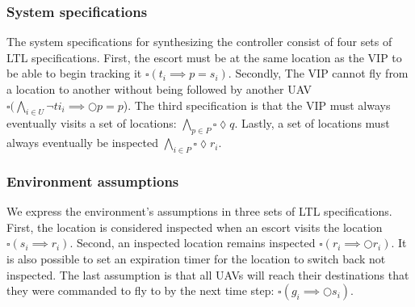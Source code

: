 \documentclass[]{article}
\begin{document}
\subsubsection{System specifications}\label{system-specifications}
The system specifications for synthesizing the controller consist of four 
sets of LTL specifications. First, the escort must be at the same location as the 
VIP to be able to begin tracking it $\square (t_{i} \implies p = s_{i})$. Secondly, The VIP 
cannot fly from a location to another without being followed by another UAV 
$\square(\bigwedge\limits_{i\in U}\lnot ti_{i} \implies \Circle p = p$). The third specification is that the VIP must always 
eventually visits a set of locations: $\bigwedge\limits_{p\in P}\square \lozenge q$. Lastly, a set of locations must 
always eventually be inspected $\bigwedge\limits_{i\in P}\square \lozenge r_{i}$.

\subsubsection{Environment assumptions}\label{environment-assumptions}
We express the environment's assumptions in three sets of LTL specifications. 
First, the location is considered inspected when an escort visits the location $\square (s_{i} \implies r_{i})$. Second, 
an inspected location remains inspected $\square (r_{i} \implies \Circle r_{i})$. It is also possible 
to set an expiration timer for the location to switch back not inspected. The 
last assumption is that all UAVs will reach their destinations that they were 
commanded to fly to by the next time step: $\square (g_{i} \implies \Circle s_{i})$.
\end{document}
